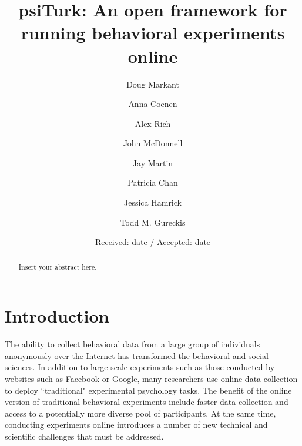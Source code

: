 \documentclass[twocolumn]{svjour3}          %
\begin{document}
\title{psiTurk: An open framework for running behavioral experiments online}

\author{Doug Markant         \and
	Anna Coenen \and
	Alex Rich \and
	John McDonnell \and
	Jay Martin \and
	Patricia Chan \and
	Jessica Hamrick \and
        Todd M. Gureckis %
}




\date{Received: date / Accepted: date}

\maketitle

\begin{abstract}
Insert your abstract here.
\end{abstract}


\section{Introduction}


The ability to collect behavioral data from a large group of individuals
anonymously over the Internet has transformed the behavioral and social
sciences.  In addition to large scale experiments such as those
conducted by websites such as Facebook or Google, many researchers
use online data collection to deploy ``traditional" experimental psychology
tasks.  The benefit of the online version of traditional behavioral experiments include 
faster data collection and access to a potentially more diverse pool of participants. 
At the same time, conducting experiments online introduces a number of new 
technical and scientific challenges that must be addressed.
\end{document}
